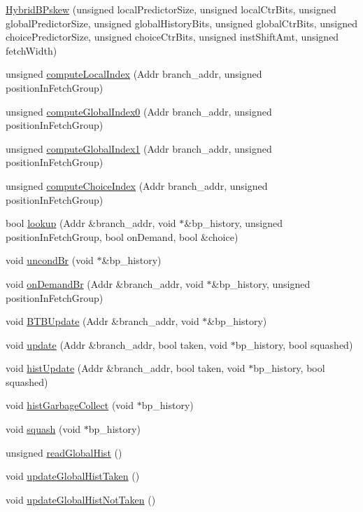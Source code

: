 \begin{DoxyCompactItemize}
\item 
\hyperlink{classHybridBPskew_a039896cdd3566d98247bf7b871766cc9}{HybridBPskew} (unsigned localPredictorSize, unsigned localCtrBits, unsigned globalPredictorSize, unsigned globalHistoryBits, unsigned globalCtrBits, unsigned choicePredictorSize, unsigned choiceCtrBits, unsigned instShiftAmt, unsigned fetchWidth)
\item 
unsigned \hyperlink{classHybridBPskew_ae8b356ac60f229ce92086836420a1d11}{computeLocalIndex} (Addr branch\_\-addr, unsigned positionInFetchGroup)
\item 
unsigned \hyperlink{classHybridBPskew_a2d3c53348902a29d3315dcec78e12a99}{computeGlobalIndex0} (Addr branch\_\-addr, unsigned positionInFetchGroup)
\item 
unsigned \hyperlink{classHybridBPskew_a4009eae987557a103d5846cd32e30333}{computeGlobalIndex1} (Addr branch\_\-addr, unsigned positionInFetchGroup)
\item 
unsigned \hyperlink{classHybridBPskew_a70b7b53463dd2cd4a6394266ea3c2ee3}{computeChoiceIndex} (Addr branch\_\-addr, unsigned positionInFetchGroup)
\item 
bool \hyperlink{classHybridBPskew_a582ad543f9fc90c933eb2c740de572ec}{lookup} (Addr \&branch\_\-addr, void $\ast$\&bp\_\-history, unsigned positionInFetchGroup, bool onDemand, bool \&choice)
\item 
void \hyperlink{classHybridBPskew_a1dbffb30d1d0f0c4c8e6a8f1084e68e4}{uncondBr} (void $\ast$\&bp\_\-history)
\item 
void \hyperlink{classHybridBPskew_ab10e5603326fd6eae8d8cdd106a625ef}{onDemandBr} (Addr \&branch\_\-addr, void $\ast$\&bp\_\-history, unsigned positionInFetchGroup)
\item 
void \hyperlink{classHybridBPskew_a5ceeff1b2e0cc39822346b1cd8fbab80}{BTBUpdate} (Addr \&branch\_\-addr, void $\ast$\&bp\_\-history)
\item 
void \hyperlink{classHybridBPskew_a4fb73465bf70ab821401f3d47e44fc91}{update} (Addr \&branch\_\-addr, bool taken, void $\ast$bp\_\-history, bool squashed)
\item 
void \hyperlink{classHybridBPskew_a5e73e9324e87d820712789f33100e5f4}{histUpdate} (Addr \&branch\_\-addr, bool taken, void $\ast$bp\_\-history, bool squashed)
\item 
void \hyperlink{classHybridBPskew_a4c3aa89615af200ad553461f20de8315}{histGarbageCollect} (void $\ast$bp\_\-history)
\item 
void \hyperlink{classHybridBPskew_a44db53115e8b3ccff2d9b7785c96f380}{squash} (void $\ast$bp\_\-history)
\item 
unsigned \hyperlink{classHybridBPskew_aa00b0494fe8fc804dd6ef9c1abf89c9d}{readGlobalHist} ()
\item 
void \hyperlink{classHybridBPskew_a9c1a201e37cbba10055ff63b9e072a69}{updateGlobalHistTaken} ()
\item 
void \hyperlink{classHybridBPskew_a07095043813d5f59978c0708efa58bd4}{updateGlobalHistNotTaken} ()
\end{DoxyCompactItemize}


